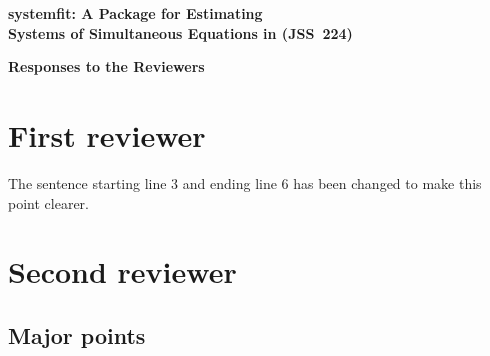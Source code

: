 \documentclass[12pt,english]{scrartcl}
\begin{document}
\begin{center}
{\Large\textbf{\textsf{
systemfit: A Package for Estimating\\[0.3em]
Systems of Simultaneous Equations in  (JSS~224)
}}}

\bigskip

{\Large\textbf{\textsf{Responses to the Reviewers}}}
\end{center}


\section{First reviewer}



The sentence starting line 3 and ending line 6
has been changed to make this point clearer.


\section{Second reviewer}




\subsection{Major points}
\end{document}
